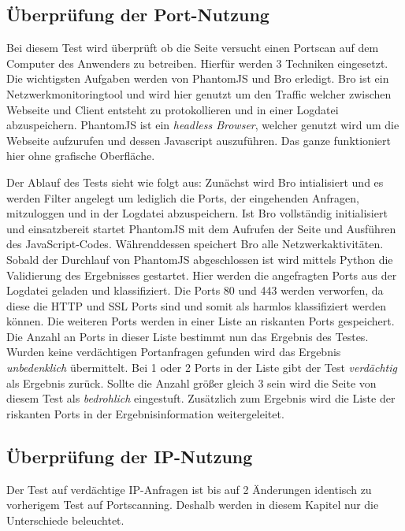 \subsection{Überprüfung der Port-Nutzung}
Bei diesem Test wird überprüft ob die Seite versucht einen Portscan auf dem Computer des Anwenders zu betreiben. Hierfür werden 3 Techniken eingesetzt. Die wichtigsten Aufgaben werden von PhantomJS und Bro erledigt.
Bro ist ein Netzwerkmonitoringtool und wird hier genutzt um den Traffic welcher zwischen Webseite und Client entsteht zu protokollieren und in einer Logdatei abzuspeichern. PhantomJS ist ein \textit{headless Browser}, welcher genutzt wird um die Webseite aufzurufen und dessen Javascript auszuführen. Das ganze funktioniert hier ohne grafische Oberfläche.

Der Ablauf des Tests sieht wie folgt aus: Zunächst wird Bro intialisiert und es werden Filter angelegt um lediglich die Ports, der eingehenden Anfragen, mitzuloggen und in der Logdatei abzuspeichern. Ist Bro vollständig initialisiert und einsatzbereit startet PhantomJS mit dem Aufrufen der Seite und Ausführen des JavaScript-Codes. Währenddessen speichert Bro alle Netzwerkaktivitäten. Sobald der Durchlauf von PhantomJS abgeschlossen ist wird mittels Python die Validierung des Ergebnisses gestartet. Hier werden die angefragten Ports aus der Logdatei geladen und klassifiziert. Die Ports 80 und 443 werden verworfen, da diese die HTTP und SSL Ports sind und somit als harmlos klassifiziert werden können. Die weiteren Ports werden in einer Liste an riskanten Ports gespeichert. Die Anzahl an Ports in dieser Liste bestimmt nun das Ergebnis des Testes. Wurden keine verdächtigen Portanfragen gefunden wird das Ergebnis \textit{unbedenklich} übermittelt. Bei 1 oder 2 Ports in der Liste gibt der Test \textit{verdächtig} als Ergebnis zurück. Sollte die Anzahl größer gleich 3 sein wird die Seite von diesem Test als \textit{bedrohlich} eingestuft. Zusätzlich zum Ergebnis wird die Liste der riskanten Ports in der Ergebnisinformation weitergeleitet.

\subsection{Überprüfung der IP-Nutzung}
Der Test auf verdächtige IP-Anfragen ist bis auf 2 Änderungen identisch zu vorherigem Test auf Portscanning. Deshalb werden in diesem Kapitel nur die Unterschiede beleuchtet.

